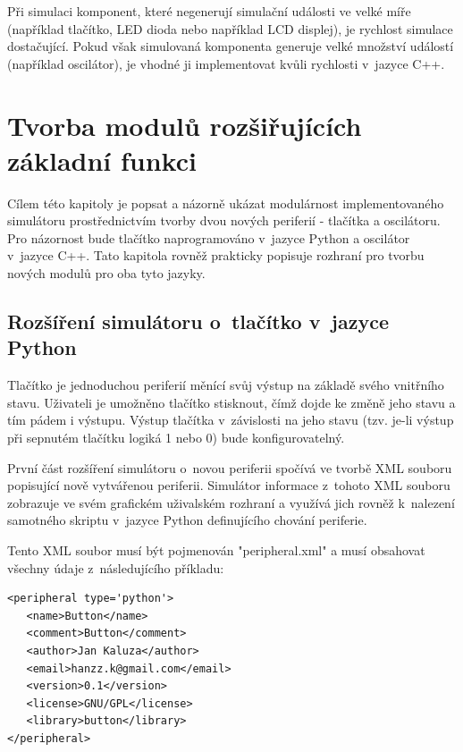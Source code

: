 Při simulaci komponent, které negenerují simulační události ve velké míře (například tlačítko, LED dioda nebo například LCD displej), je rychlost simulace dostačující. Pokud však simulovaná komponenta generuje velké množství událostí (například oscilátor), je vhodné ji implementovat kvůli rychlosti v~jazyce C++.

\chapter{Tvorba modulů rozšiřujících základní funkci}
\label{pripad}

Cílem této kapitoly je popsat a názorně ukázat modulárnost implementovaného simulátoru prostřednictvím tvorby dvou nových periferií - tlačítka a oscilátoru. Pro názornost bude tlačítko naprogramováno v~jazyce Python a oscilátor v~jazyce C++. Tato kapitola rovněž prakticky popisuje rozhraní pro tvorbu nových modulů pro oba tyto jazyky.

\section{Rozšíření simulátoru o~tlačítko v~jazyce Python}
\label{tlacitko}

Tlačítko je jednoduchou periferií měnící svůj výstup na základě svého vnitřního stavu. Uživateli je umožněno tlačítko stisknout, čímž dojde ke změně jeho stavu a tím pádem i výstupu. Výstup tlačítka v~závislosti na jeho stavu (tzv. je-li výstup při sepnutém tlačítku logiká 1 nebo 0) bude konfigurovatelný.

První část rozšíření simulátoru o~novou periferii spočívá ve tvorbě XML souboru popisující nově vytvářenou periferii. Simulátor informace z~tohoto XML souboru zobrazuje ve svém grafickém uživalském rozhraní a využívá jich rovněž k~nalezení samotného skriptu v~jazyce Python definujícího chování periferie.

Tento XML soubor musí být pojmenován "peripheral.xml" a musí obsahovat všechny údaje z~následujícího příkladu:

\lstset{language=XML, numbers=left, frame=single, breaklines=true, tabsize=2, xleftmargin=20pt}
\begin{lstlisting}
<peripheral type='python'>
   <name>Button</name>
   <comment>Button</comment>
   <author>Jan Kaluza</author>
   <email>hanzz.k@gmail.com</email>
   <version>0.1</version>
   <license>GNU/GPL</license>
   <library>button</library>
</peripheral>
\end{lstlisting}

